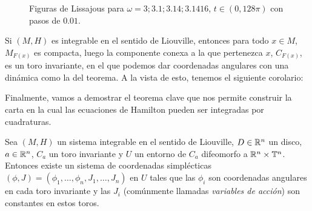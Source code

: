 \begin{obs}
\begin{figure}[h]
  \caption{Figuras de Lissajous para $\omega=3;3.1;3.14;3.1416$, $t \in (0,128\pi)$ con pasos de $0.01$.}
  \label{fig:lissajous}
\end{figure}
\end{obs}

Si $(M,H)$ es integrable en el sentido de Liouville, entonces para todo $x \in M$, $M_{F(x)}$ es compacta, luego la componente conexa a la que pertenezca $x$, $C_{F(x)}$, es un toro invariante, en el que podemos dar coordenadas angulares con una dinámica como la del teorema. A la vista de esto, tenemos el siguiente corolario:


Finalmente, vamos a demostrar el teorema clave que nos permite construir la carta en la cual las ecuaciones de Hamilton pueden ser integradas por cuadraturas.
\begin{thm}
  Sea $(M,H)$ un sistema integrable en el sentido de Liouville, $D \in \mathbb{R}^n$ un disco, $a \in \mathbb{R}^n$, $C_a$ un toro invariante y $U$ un entorno de $C_a$ difeomorfo a $\mathbb{R}^n \times \mathbb{T}^n$. Entonces existe un sistema de coordenadas simplécticas $(\phi,J)=(\phi_1,\dots,\phi_n,J_1,\dots,J_n)$ en $U$ tales que las $\phi_i$ son coordenadas angulares en cada toro invariante y las $J_i$ (comúnmente llamadas \emph{variables de acción}) son constantes en estos toros.
\end{thm}

